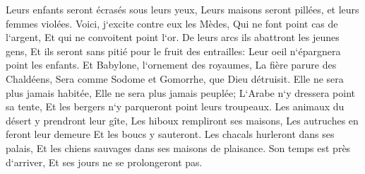 \verse Leurs enfants seront écrasés sous leurs yeux, Leurs maisons seront pillées, et leurs femmes violées. 
\verse Voici, j`excite contre eux les Mèdes, Qui ne font point cas de l`argent, Et qui ne convoitent point l`or. 
\verse De leurs arcs ils abattront les jeunes gens, Et ils seront sans pitié pour le fruit des entrailles: Leur oeil n`épargnera point les enfants. 
\verse Et Babylone, l`ornement des royaumes, La fière parure des Chaldéens, Sera comme Sodome et Gomorrhe, que Dieu détruisit. 
\verse Elle ne sera plus jamais habitée, Elle ne sera plus jamais peuplée; L`Arabe n`y dressera point sa tente, Et les bergers n`y parqueront point leurs troupeaux. 
\verse Les animaux du désert y prendront leur gîte, Les hiboux rempliront ses maisons, Les autruches en feront leur demeure Et les boucs y sauteront. 
\verse Les chacals hurleront dans ses palais, Et les chiens sauvages dans ses maisons de plaisance. Son temps est près d`arriver, Et ses jours ne se prolongeront pas. 

\chapter{}

